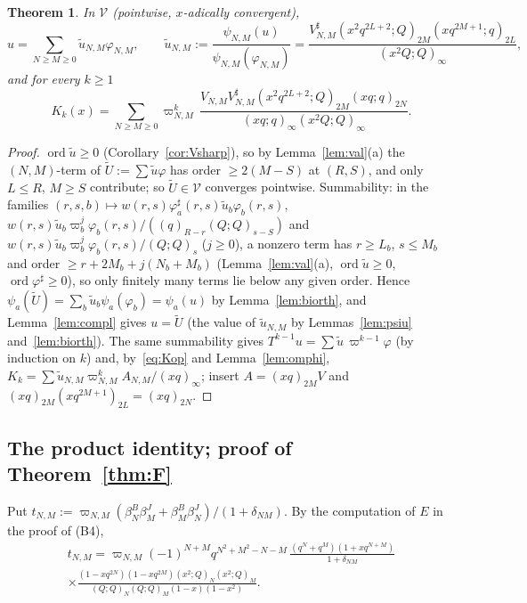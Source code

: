 \documentclass[11pt]{amsart}
\newtheorem{theorem}{Theorem}[section]
\theoremstyle{definition}
\numberwithin{equation}{section}
\begin{document}
\begin{theorem}\label{thm:spec}
In $\mathcal V$ (pointwise, $x$-adically convergent),
\[
u=\sum_{N\ge M\ge0}\tilde u_{N,M}\varphi_{N,M},\qquad
\tilde u_{N,M}:=\frac{\psi_{N,M}(u)}{\psi_{N,M}(\varphi_{N,M})}=\frac{V^\sharp_{N,M}(x^2q^{2L+2};Q)_{2M}(xq^{2M+1};q)_{2L}}{(x^2Q;Q)_\infty},
\]
and for every $k\ge1$
\[
K_k(x)=\sum_{N\ge M\ge0}\varpi_{N,M}^k\,\frac{V_{N,M}V^\sharp_{N,M}(x^2q^{2L+2};Q)_{2M}(xq;q)_{2N}}{(xq;q)_\infty(x^2Q;Q)_\infty}.
\]
\end{theorem}
\begin{proof}
$\operatorname{ord}\tilde u\ge0$ (Corollary~\ref{cor:Vsharp}), so by Lemma~\ref{lem:val}(a) the $(N,M)$-term of
$\tilde U:=\sum\tilde u\varphi$ has order $\ge2(M-S)$ at $(R,S)$, and only $L\le R$, $M\ge S$ contribute; so $\tilde U\in\mathcal V$
converges pointwise. Summability: in the families $(r,s,b)\mapsto w(r,s)\varphi^\sharp_a(r,s)\tilde u_b\varphi_b(r,s)$,
$w(r,s)\tilde u_b\varpi_b^{j}\varphi_b(r,s)/((q)_{R-r}(Q;Q)_{s-S})$ and $w(r,s)\tilde u_b\varpi_b^{j}\varphi_b(r,s)/(Q;Q)_s$ ($j\ge0$), a
nonzero term has $r\ge L_b$, $s\le M_b$ and order $\ge r+2M_b+j(N_b+M_b)$ (Lemma~\ref{lem:val}(a), $\operatorname{ord}\tilde u\ge0$,
$\operatorname{ord}\varphi^\sharp\ge0$), so only finitely many terms lie below any given order. Hence
$\psi_a(\tilde U)=\sum_b\tilde u_b\psi_a(\varphi_b)=\psi_a(u)$ by Lemma~\ref{lem:biorth}, and Lemma~\ref{lem:compl} gives
$u=\tilde U$ (the value of $\tilde u_{N,M}$ by Lemmas~\ref{lem:psiu} and~\ref{lem:biorth}). The same summability gives
$T^{k-1}u=\sum\tilde u\,\varpi^{k-1}\varphi$ (by induction on $k$) and, by~\eqref{eq:Kop} and Lemma~\ref{lem:omphi},
$K_k=\sum\tilde u_{N,M}\varpi^k_{N,M}A_{N,M}/(xq)_\infty$; insert $A=(xq)_{2M}V$ and $(xq)_{2M}(xq^{2M+1})_{2L}=(xq)_{2N}$.
\end{proof}

\subsection{The product identity; proof of Theorem~\ref{thm:F}}\label{ssec:proofF}
Put $t_{N,M}:=\varpi_{N,M}(\beta^B_N\beta^J_M+\beta^B_M\beta^J_N)/(1+\delta_{NM})$. By the computation of $E$ in the proof of (B4),
\begin{multline*}
t_{N,M}=\varpi_{N,M}(-1)^{N+M}q^{N^2+M^2-N-M}\,\frac{(q^N+q^M)(1+xq^{N+M})}{1+\delta_{NM}}\\
\times\frac{(1-xq^{2N})(1-xq^{2M})(x^2;Q)_N(x^2;Q)_M}{(Q;Q)_N(Q;Q)_M(1-x)(1-x^2)}.
\end{multline*}
\end{document}
